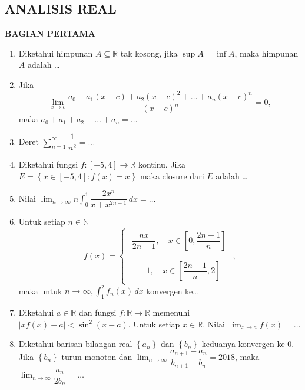 \documentclass[12pt,twoside]{article}
\begin{document}
\subsection{ANALISIS REAL}
\textbf{BAGIAN PERTAMA}
\begin{enumerate}
	\item Diketahui himpunan $A \subseteq \mathbb{R}$ tak kosong, jika $\sup A = \inf A$, maka himpunan $A$ adalah \dots

	\item Jika
	      \begin{equation*}
		      \displaystyle\lim_{x \to c} \dfrac{a_0+a_1(x-c)+a_2(x-c)^2+\dots+a_n(x-c)^n}{(x-c)^n} = 0,
	      \end{equation*}
	      maka \(
	      a_0+a_1+a_2+\dots+a_n =\dots
	      \)

	\item Deret $\displaystyle\sum_{n=1}^{\infty} \dfrac{1}{n^2} =\dots$

	\item Diketahui fungsi $f : [-5,4] \to \mathbb{R}$ kontinu. Jika $E = \left\lbrace x \in[-5,4] : f(x) = x \right\rbrace$ maka closure dari $E$ adalah \dots

	\item Nilai $\displaystyle\lim_{n \to \infty} n \int_{0}^{1} \dfrac{2x^n}{x+x^{2n+1}} \, dx =\dots$

	\item Untuk setiap $n \in \mathbb{N}$
	      \begin{equation*}
		      f(x) = \begin{cases}
			      \begin{array}{rr}
				      \dfrac{nx}{2n-1}, & ~x \in \left[0, \dfrac{2n-1}{n}\right]
			      \end{array} \\ \\
			      \begin{array}{rr}
				      ~~~~~~~~1, & ~x \in \left[\dfrac{2n-1}{n},2\right]
			      \end{array}
		      \end{cases},
	      \end{equation*}
	      maka untuk $n \to \infty, \displaystyle\int_{1}^{2}f_n(x)\,dx$ konvergen ke\dots

	\item Diketahui $a \in \mathbb{R}$ dan fungsi $f : \mathbb{R} \to \mathbb{R}$ memenuhi $|xf(x)+a|<\sin^2(x-a).$ Untuk setiap $x \in \mathbb{R}$. Nilai $\displaystyle\lim_{x \to a} f(x) = \dots$

	\item Diketahui barisan bilangan real $\left\lbrace a_n \right\rbrace$ dan $\left\lbrace b_n \right\rbrace$ keduanya konvergen ke 0. Jika $\left\lbrace b_n \right\rbrace$ turun monoton dan $\displaystyle\lim_{n \to \infty} \dfrac{a_{n+1}-a_n}{b_{n+1}-b_n} = 2018$, maka $\displaystyle\lim_{n \to \infty} \dfrac{a_n}{2b_n} =\dots $

\end{enumerate}
\end{document}
